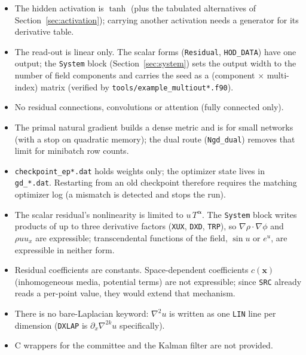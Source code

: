 \documentclass[10pt,a4paper]{article}
\newcommand{\code}[1]{\texttt{#1}}
\newcommand{\mi}[1]{\boldsymbol{#1}}
\begin{document}
\begin{itemize}[leftmargin=1.4em]
\item The hidden activation is $\tanh$ (plus the tabulated
      alternatives of Section~\ref{sec:activation}); carrying another
      activation needs a generator for its derivative table.
\item The read-out is linear only. The scalar forms
      (\code{Residual}, \code{HOD\_DATA}) have one output; the
      \code{System} block (Section~\ref{sec:system}) sets the output
      width to the number of field components and carries the seed as
      a (component $\times$ multi-index) matrix (verified by
      \code{tools/example\_multiout*.f90}).
\item No residual connections, convolutions or attention (fully
      connected only).
\item The primal natural gradient builds a dense metric and is for
      small networks (with a stop on quadratic memory); the dual
      route (\code{Ngd\_dual}) removes that limit for minibatch row
      counts.
\item \code{checkpoint\_ep*.dat} holds weights only; the optimizer
      state lives in \code{gd\_*.dat}. Restarting from an old
      checkpoint therefore requires the matching optimizer log (a
      mismatch is detected and stops the run).
\item The scalar residual's nonlinearity is limited to
      $u\,T^{\mi\alpha}$. The \code{System} block writes products of
      up to three derivative factors (\code{XUX}, \code{DXD},
      \code{TRP}), so $\nabla\rho\!\cdot\!\nabla\phi$ and
      $\rho u u_x$ are expressible; transcendental functions of the
      field, $\sin u$ or $e^u$, are expressible in neither form.
\item Residual coefficients are constants. Space-dependent
      coefficients $c(\mi{x})$ (inhomogeneous media, potential
      terms) are not expressible; since \code{SRC} already reads a
      per-point value, they would extend that mechanism.
\item There is no bare-Laplacian keyword: $\nabla^2u$ is written as
      one \code{LIN} line per dimension (\code{DXLAP} is
      $\partial_x\nabla^{2k}u$ specifically).
\item C wrappers for the committee and the Kalman filter are not
      provided.
\end{itemize}
\end{document}
